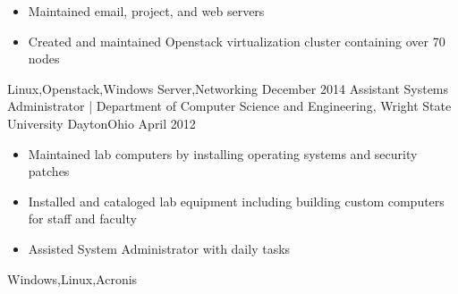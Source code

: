 \begin{experiences}
{\begin{itemize}
                        \item Maintained email, project, and web servers
                        \item Created and maintained Openstack virtualization cluster containing over 70 nodes
                      \end{itemize}
                    }
                    {Linux,Openstack,Windows Server,Networking}
  \emptySeparator
  \experience
    {December 2014}     { Assistant Systems Administrator | Department of Computer Science and Engineering, Wright State University }{Dayton}{Ohio}
    {April 2012}    {
                      \begin{itemize}
                        \item Maintained lab computers by installing operating systems and security patches
                        \item Installed and cataloged lab equipment including building custom computers for staff and faculty
                        \item Assisted System Administrator with daily tasks
                      \end{itemize}
                    }
                    {Windows,Linux,Acronis}


\end{experiences}
